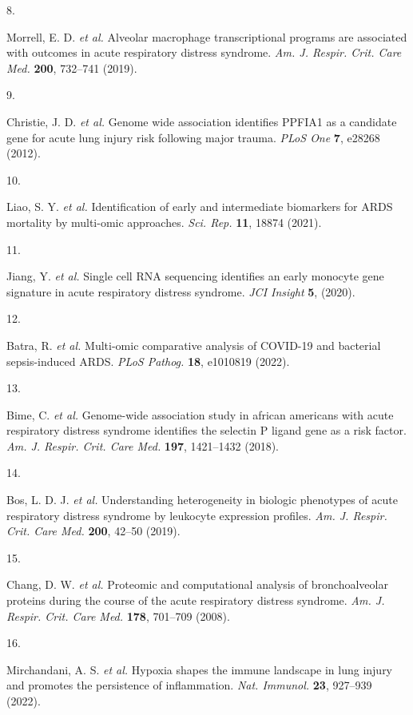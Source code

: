 \documentclass[
  11,
  a4paper,
]{article}
\newlength{\cslhangindent}
\newlength{\csllabelwidth}
\newenvironment{CSLReferences}[2] %
 {\begin{list}{}{%
  \setlength{\itemindent}{0pt}
  \setlength{\leftmargin}{0pt}
  \setlength{\parsep}{0pt}
  \ifodd #1
   \setlength{\leftmargin}{\cslhangindent}
   \setlength{\itemindent}{-1\cslhangindent}
  \fi
  \setlength{\itemsep}{#2\baselineskip}}}
 {\end{list}}
\newcommand{\CSLLeftMargin}[1]{\parbox[t]{\csllabelwidth}{\strut#1\strut}}
\newcommand{\CSLRightInline}[1]{\parbox[t]{\linewidth - \csllabelwidth}{\strut#1\strut}}
\begin{document}
\begin{CSLReferences}{0}{0}
\CSLLeftMargin{8. }%
\CSLRightInline{Morrell, E. D. \emph{et al.} Alveolar macrophage
transcriptional programs are associated with outcomes in acute
respiratory distress syndrome. \emph{Am. J. Respir. Crit. Care Med.}
\textbf{200}, 732--741 (2019).}

\CSLLeftMargin{9. }%
\CSLRightInline{Christie, J. D. \emph{et al.} Genome wide association
identifies {PPFIA1} as a candidate gene for acute lung injury risk
following major trauma. \emph{PLoS One} \textbf{7}, e28268 (2012).}

\CSLLeftMargin{10. }%
\CSLRightInline{Liao, S. Y. \emph{et al.} Identification of early and
intermediate biomarkers for {ARDS} mortality by multi-omic approaches.
\emph{Sci. Rep.} \textbf{11}, 18874 (2021).}

\CSLLeftMargin{11. }%
\CSLRightInline{Jiang, Y. \emph{et al.} Single cell {RNA} sequencing
identifies an early monocyte gene signature in acute respiratory
distress syndrome. \emph{JCI Insight} \textbf{5}, (2020).}

\CSLLeftMargin{12. }%
\CSLRightInline{Batra, R. \emph{et al.} Multi-omic comparative analysis
of {COVID-19} and bacterial sepsis-induced {ARDS}. \emph{PLoS Pathog.}
\textbf{18}, e1010819 (2022).}

\CSLLeftMargin{13. }%
\CSLRightInline{Bime, C. \emph{et al.} Genome-wide association study in
african americans with acute respiratory distress syndrome identifies
the selectin {P} ligand gene as a risk factor. \emph{Am. J. Respir.
Crit. Care Med.} \textbf{197}, 1421--1432 (2018).}

\CSLLeftMargin{14. }%
\CSLRightInline{Bos, L. D. J. \emph{et al.} Understanding heterogeneity
in biologic phenotypes of acute respiratory distress syndrome by
leukocyte expression profiles. \emph{Am. J. Respir. Crit. Care Med.}
\textbf{200}, 42--50 (2019).}

\CSLLeftMargin{15. }%
\CSLRightInline{Chang, D. W. \emph{et al.} Proteomic and computational
analysis of bronchoalveolar proteins during the course of the acute
respiratory distress syndrome. \emph{Am. J. Respir. Crit. Care Med.}
\textbf{178}, 701--709 (2008).}

\CSLLeftMargin{16. }%
\CSLRightInline{Mirchandani, A. S. \emph{et al.} Hypoxia shapes the
immune landscape in lung injury and promotes the persistence of
inflammation. \emph{Nat. Immunol.} \textbf{23}, 927--939 (2022).}


\end{CSLReferences}
\end{document}
